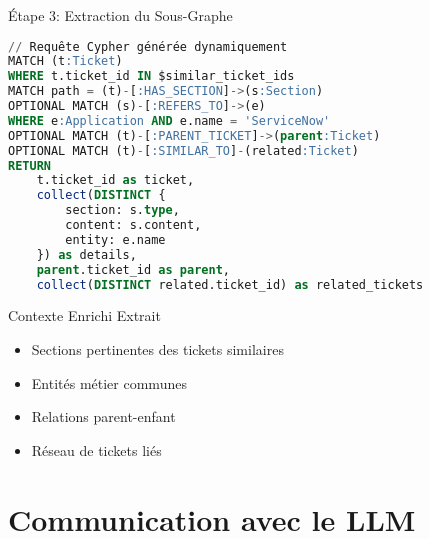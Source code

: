 \documentclass[10pt, aspectratio=169]{beamer}
\begin{document}
\begin{frame}[fragile]{Étape 3: Extraction du Sous-Graphe}
    \begin{lstlisting}[language=SQL, basicstyle=\tiny\ttfamily, keywordstyle=\color{neo4jgreen}\bfseries]
// Requête Cypher générée dynamiquement
MATCH (t:Ticket)
WHERE t.ticket_id IN $similar_ticket_ids
MATCH path = (t)-[:HAS_SECTION]->(s:Section)
OPTIONAL MATCH (s)-[:REFERS_TO]->(e)
WHERE e:Application AND e.name = 'ServiceNow'
OPTIONAL MATCH (t)-[:PARENT_TICKET]->(parent:Ticket)
OPTIONAL MATCH (t)-[:SIMILAR_TO]-(related:Ticket)
RETURN 
    t.ticket_id as ticket,
    collect(DISTINCT {
        section: s.type,
        content: s.content,
        entity: e.name
    }) as details,
    parent.ticket_id as parent,
    collect(DISTINCT related.ticket_id) as related_tickets
    \end{lstlisting}
    
    \begin{block}{Contexte Enrichi Extrait}
        \begin{itemize}
            \item \faCheckSquare{} Sections pertinentes des tickets similaires
            \item \faCheckSquare{} Entités métier communes
            \item \faCheckSquare{} Relations parent-enfant
            \item \faCheckSquare{} Réseau de tickets liés
        \end{itemize}
    \end{block}
\end{frame}

\section{Communication avec le LLM}
\end{document}
